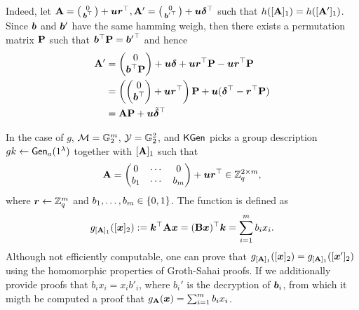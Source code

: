 Indeed, let $\mathbf{{A}}=\left(\begin{smallmatrix}0\\{\boldsymbol{b}}^\top\end{smallmatrix}\right)+{\boldsymbol{u}}{\boldsymbol{r}}^\top,\mathbf{{A}}'=\left(\begin{smallmatrix}0\\{{\boldsymbol{b}}'}^\top\end{smallmatrix}\right)+{\boldsymbol{u}}{\boldsymbol{\delta}}^\top$ such that $h([\mathbf{{A}}]_1)=h([\mathbf{{A}}']_1)$. Since ${\boldsymbol{b}}$ and ${\boldsymbol{b}}'$ have the same hamming weigh, then there exists a permutation matrix $\mathbf{{P}}$ such that ${\boldsymbol{b}}^\top\mathbf{{P}} = {{\boldsymbol{b}}'}^\top$ and hence
\begin{align*}
\mathbf{{A}}' &= \left(\begin{matrix}0\\{\boldsymbol{b}}^\top\mathbf{{P}}\end{matrix}\right) + {\boldsymbol{u}}{\boldsymbol{\delta}} + {\boldsymbol{u}}{\boldsymbol{r}}^\top\mathbf{{P}} - {\boldsymbol{u}}{\boldsymbol{r}}^\top\mathbf{{P}}\\
&=
 \left(\left(\begin{matrix}0\\{\boldsymbol{b}}^\top\end{matrix}\right) + {\boldsymbol{u}}{\boldsymbol{r}}^\top \right)\mathbf{{P}} + {\boldsymbol{u}}({\boldsymbol{\delta}}^\top-{\boldsymbol{r}}^\top\mathbf{{P}})\\
 &=
 \mathbf{{A}}\mathbf{{P}} + {\boldsymbol{u}}\tilde{{\boldsymbol{\delta}}}^\top
\end{align*}

In the case of $g$, $\mathcal{M}=\mathbb{G}^m_2$, $\mathcal{Y}=\mathbb{G}_2^2$, and $\mathsf{KGen}$ picks a group description $gk\gets\mathsf{Gen}_a(1^\lambda)$ together with $[\mathbf{{A}}]_1$ such that
$$
\mathbf{{A}}  = \left(\begin{matrix}0 & \cdots & 0\\ b_1 & \cdots & b_m\end{matrix}\right) +{\boldsymbol{u}}{\boldsymbol{r}}^\top \in\mathbb{Z}^{2\times m}_q,
$$
 where ${\boldsymbol{r}}\gets\mathbb{Z}_q^m$ and $b_1,\ldots,b_m\in\{0,1\}$. The function is defined as
$$
g_{[\mathbf{{A}}]_1}([{\boldsymbol{x}}]_2):= {\boldsymbol{k}}^\top\mathbf{{A}}{\boldsymbol{x}}=(\mathbf{{B}}{\boldsymbol{x}})^\top{\boldsymbol{k}}=\sum_{i=1}^m b_ix_i.
$$
Although not efficiently computable, one can prove that 
 $g_{[\mathbf{{A}}]_1}([{\boldsymbol{x}}]_2) = g_{[\mathbf{{A}}]_1}([{\boldsymbol{x}}']_2)$
 using the homomorphic properties of Groth-Sahai proofs. If we additionally provide proofs that $b_ix_i=x_ib'_i$, where $b_i'$ is the decryption of ${\boldsymbol{b}}_i$, from which it migth be computed a proof that $g_{\mathbf{{A}}}({\boldsymbol{x}})=\sum_{i=1}^m b_ix_i$.

